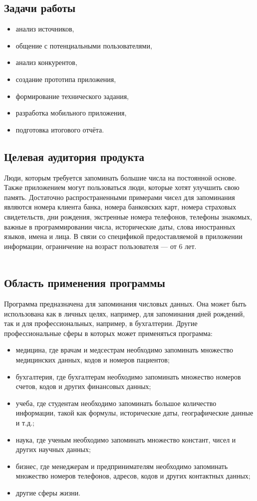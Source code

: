 \documentclass[draft]{article}
\begin{document}
\subsection{Задачи работы}
\begin{itemize}
\item анализ источников,
\item общение с потенциальными пользователями,
\item анализ конкурентов,
\item создание прототипа приложения,
\item формирование технического задания,
\item разработка мобильного приложения,
\item подготовка итогового отчёта.
\end{itemize}
\subsection{Целевая аудитория продукта}
Люди, которым требуется запоминать большие числа на постоянной основе. Также приложением могут пользоваться люди, которые хотят улучшить свою память. Достаточно распространенными примерами чисел для запоминания являются номера клиента банка, номера банковских карт, номера страховых свидетельств, дни рождения, экстренные номера телефонов, телефоны знакомых, важные в программировании числа, исторические даты, слова иностранных языков, имена и лица. В связи со спецификой предоставляемой в приложении информации, ограничение на возраст пользователя — от 6 лет.\\
~\\
\subsection{Область применения программы}
Программа предназначена для запоминания числовых данных. Она может быть использована как в личных целях, например, для запоминания дней рождений, так и для профессиональных, например, в бухгалтерии. Другие профессиональные сферы в которых может применяться программа:
\begin{itemize}
\item медицина, где врачам и медсестрам необходимо запоминать множество медицинских данных, кодов и номеров пациентов;
\item бухгалтерия, где бухгалтерам необходимо запоминать множество номеров счетов, кодов и других финансовых данных;
\item учеба, где студентам необходимо запоминать большое количество информации, такой как формулы, исторические даты, географические данные и т.д.;
\item наука, где ученым необходимо запоминать множество констант, чисел и других научных данных;
\item бизнес, где менеджерам и предпринимателям необходимо запоминать множество номеров телефонов, адресов, кодов и других контактных данных;
\item другие сферы жизни.
\end{itemize}
\end{document}
